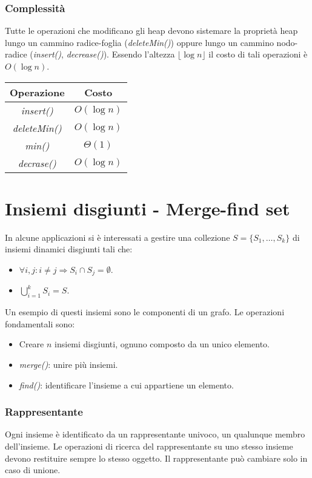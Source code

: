 \subsubsection{Complessit\`a}
Tutte le operazioni che modificano gli heap devono sistemare la propriet\`a heap lungo un cammino radice-foglia (\emph{deleteMin()}) oppure lungo un cammino
nodo-radice (\emph{insert()}, \emph{decrease()}). Essendo l'altezza $\lfloor\log n\rfloor$ il costo di tali operazioni \`e $O(\log n)$.
\begin{center}
\begin{tabular}{|c|c|}
\hline
Operazione & Costo\\
\hline
\emph{insert()}& $O(\log n)$\\
\hline
\emph{deleteMin()} & $O(\log n)$\\
\hline
\emph{min()} & $\Theta(1)$\\
\hline
\emph{decrase()} & $O(\log n)$\\
\hline
\end{tabular}
\end{center}
\section{Insiemi disgiunti - Merge-find set}
In alcune applicazioni si \`e interessati a gestire una collezione $S=\{S_1, \dots, S_k\}$ di insiemi dinamici disgiunti tali che:
\begin{itemize}
\item $\forall i, j: i\neq j\Rightarrow S_i\cap S_j = \emptyset$.
\item $\bigcup\limits_{i =1}^k S_i = S$.
\end{itemize}
Un esempio di questi insiemi sono le componenti di un grafo. Le operazioni fondamentali sono: 
\begin{itemize}
\item Creare $n$ insiemi disgiunti, ognuno composto da un unico elemento.
\item \emph{merge()}: unire pi\`u insiemi.
\item \emph{find()}: identificare l'insieme a cui appartiene un elemento.
\end{itemize}
\subsubsection{Rappresentante}
Ogni insieme \`e identificato da un rappresentante univoco, un qualunque membro dell'insieme. Le operazioni di ricerca del rappresentante su uno stesso insieme devono restituire sempre lo stesso oggetto. Il
rappresentante pu\`o cambiare solo in caso di unione.
